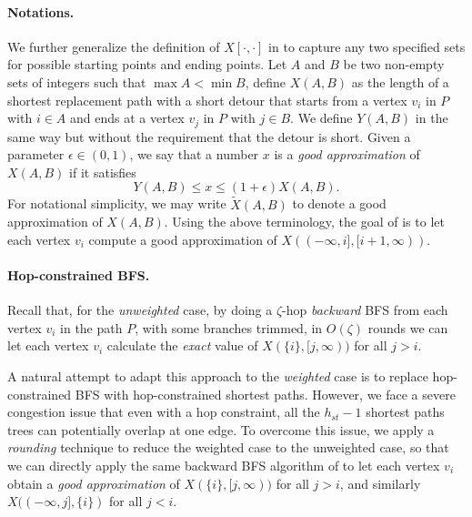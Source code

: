 \paragraph{Notations.} We further generalize the definition of $X[\cdot,\cdot]$ in  to capture any two specified sets for possible starting points and ending points. Let $A$ and $B$ be two non-empty sets of integers such that $\max A < \min B$, define $X(A,B)$ as the length of a shortest replacement path with a short detour that starts from a vertex $v_i$ in $P$ with $i \in A$ and ends at a vertex $v_j$ in $P$ with $j \in B$. We define $Y(A,B)$ in the same way but without the requirement that the detour is short. Given a parameter $\epsilon \in (0,1)$, we say that a number $x$ is a \emph{good approximation} of $X(A,B)$ if it satisfies
\[Y(A,B) \leq x \leq (1+\epsilon)X(A,B).\]
For notational simplicity, we may write $\widetilde{X}(A,B)$ to denote a good approximation of $X(A,B)$.
Using the above terminology, the goal of  is to let each vertex $v_i$ compute a good approximation of $X((-\infty,i], [i+1, \infty))$.


\paragraph{Hop-constrained BFS.} Recall that, for the \emph{unweighted} case, by doing a $\zeta$-hop \emph{backward} BFS from each vertex $v_i$ in the path $P$, with some branches trimmed, in $O(\zeta)$ rounds we can let each vertex $v_i$ calculate the \emph{exact} value of $X(\{i\}, [j, \infty))$ for all $j > i$.

A natural attempt to adapt this approach to the \emph{weighted} case is to replace hop-constrained BFS with hop-constrained shortest paths. However, we face a severe congestion issue that even with a hop constraint, all the $h_{st}-1$ shortest paths trees can potentially overlap at one edge. To overcome this issue, we apply a \emph{rounding} technique to reduce the weighted case to the unweighted case, so that we can directly apply the same backward BFS algorithm of  to let each vertex $v_i$ obtain a \emph{good approximation} of $X(\{i\}, [j, \infty))$ for all $j > i$, and similarly $X((-\infty, j], \{i\})$ for all $j < i$.

